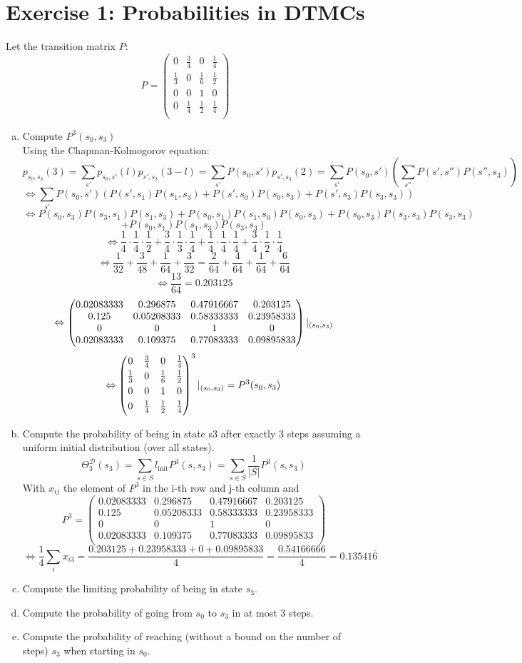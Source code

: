 \documentclass[a4paper]{article}
\newcommand{\pmat}{\begin{pmatrix}	
	0 			& \frac{3}{4} & 0 			& \frac{1}{4} \\[3pt]
	\frac{1}{3} & 0			  & \frac{1}{6} & \frac{1}{2} \\[3pt]
	0			& 0			  & 1 			& 0			  \\[3pt]
	0			& \frac{1}{4} & \frac{1}{2}	& \frac{1}{4} \\[3pt]
	\end{pmatrix} }
\newcommand{\pppmat}{\begin{pmatrix}	
	0.02083333 			& 0.296875 & 0.47916667 			& 0.203125 \\
	0.125 & 0.05208333			  & 0.58333333 & 0.23958333 \\
	0			& 0			  & 1 			& 0			  \\
	0.02083333			& 0.109375 & 0.77083333	& 0.09895833 \\
	\end{pmatrix} }
\begin{document}
	
	\section*{Exercise 1: Probabilities in DTMCs}\label{sec:exercise1}
	Let the transition matrix $P$: 
	\[  P = \pmat \]
   \begin{enumerate}[a.]
       \item Compute $P^3(s_0,s_3)$ \\
       Using the Chapman-Kolmogorov equation:
           \[ p_{s_0,s_3} (3) = \sum_{s'} p_{s_0, s'}(l) p_{s', s_3}(3 - l) = \sum_{s'} P(s_0, s') p_{s', s_3}(2)  =  \sum_{s'} P(s_0, s') (\sum_{s''} P(s', s'') P(s'', s_3))\]
           \[  \Leftrightarrow  \sum_{s'} P(s_0, s') (P(s',s_1) P(s_1, s_3) + P(s', s_0) P (s_0, s_3) + P(s', s_3)P(s_3, s_3))  \]
            \[  \Leftrightarrow  P(s_0, s_3)P(s_3, s_1) P(s_1, s_3) + P(s_0, s_1)  P(s_1, s_0) P(s_0, s_3)  +  P(s_0, s_3)P(s_3, s_3)P(s_3, s_3) \]
            \[ + P(s_0, s_1) P(s_1, s_3) P(s_3, s_3) \]
             \[  \Leftrightarrow  \frac{1}{4} \cdot \frac{1}{4} \cdot \frac{1}{2} + \frac{3}{4} \cdot \frac{1}{3} \cdot \frac{1}{4}  +  \frac{1}{4} \cdot \frac{1}{4} \cdot \frac{1}{4} +  \frac{3}{4} \cdot \frac{1}{2} \cdot \frac{1}{4} \]
             \[ \Leftrightarrow \frac{1}{32} + \frac{3}{48} + \frac{1}{64} + \frac{3}{32} = \frac{2}{64} + \frac{4}{64} + \frac{1}{64} + \frac{6}{64} \]
             \[ \Leftrightarrow \frac{13}{64} = 0.203125\]
             \[ \Leftrightarrow \pppmat \huge\vert_{(s_0,s_3)} \]
             \[ \Leftrightarrow \pmat^3 \huge\vert_{(s_0,s_3)} = P^3(s_0, s_3) \]
             
        \item Compute the probability of being in state s3 after exactly 3 steps assuming a uniform initial  distribution (over all states).
            \[ \Theta_3^{\mathcal{D}} (s_3) = \sum_{s \in S} \textit{l}_{\text{init}} P^3 (s, s_3) = \sum_{s \in S} \frac{1}{|S|} P^3 (s, s_3) \]
            With $x_{ij}$ the element of $P^3$ in the i-th row and j-th column and \[ P^3 = \pppmat \]
            \[	\Leftrightarrow \frac{1}{4} \sum_i x_{i3} = \frac{0.203125 + 0.23958333 + 0 + 0.09895833}{4} = \frac{0.54166666}{4} = 0.13541\overline{6} \]
        \item Compute the limiting probability of being in state $s_3$.
        
        \item Compute the probability of going from $s_0$ to $s_3$ in at most 3 steps.
        \item Compute the probability of reaching (without a bound on the number of steps) $s_3$ when starting in $s_0$.
        
   \end{enumerate}
\end{document}
